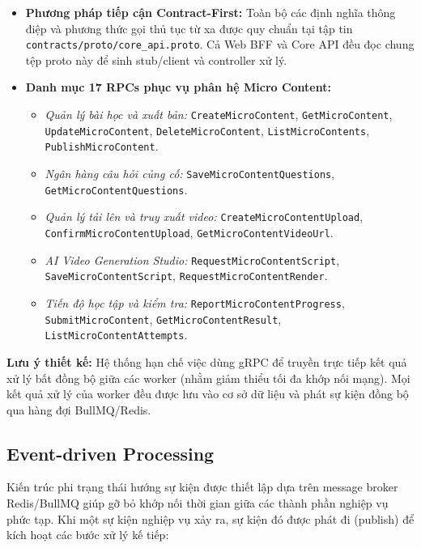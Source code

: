 \begin{itemize}
    \item \textbf{Phương pháp tiếp cận Contract-First:} Toàn bộ các định nghĩa
          thông điệp và phương thức gọi thủ tục từ xa được quy chuẩn tại tập tin
          \texttt{contracts/proto/core\_api.proto}. Cả Web BFF và Core API đều
          đọc chung tệp proto này để sinh stub/client và controller xử lý.
    \item \textbf{Danh mục 17 RPCs phục vụ phân hệ Micro Content:}
    \begin{itemize}
        \item \textit{Quản lý bài học và xuất bản:} \texttt{CreateMicroContent},
              \texttt{GetMicroContent}, \texttt{UpdateMicroContent},
              \texttt{DeleteMicroContent}, \texttt{ListMicroContents},
              \texttt{PublishMicroContent}.
        \item \textit{Ngân hàng câu hỏi củng cố:} \texttt{SaveMicroContentQuestions},
              \texttt{GetMicroContentQuestions}.
        \item \textit{Quản lý tải lên và truy xuất video:}
              \texttt{CreateMicroContentUpload}, \texttt{ConfirmMicroContentUpload},
              \texttt{GetMicroContentVideoUrl}.
        \item \textit{AI Video Generation Studio:}
              \texttt{RequestMicroContentScript}, \texttt{SaveMicroContentScript},
              \texttt{RequestMicroContentRender}.
        \item \textit{Tiến độ học tập và kiểm tra:}
              \texttt{ReportMicroContentProgress}, \texttt{SubmitMicroContent},
              \texttt{GetMicroContentResult}, \texttt{ListMicroContentAttempts}.
    \end{itemize}
\end{itemize}

\textbf{Lưu ý thiết kế:} Hệ thống hạn chế việc dùng gRPC để truyền trực
tiếp kết quả xử lý bất đồng bộ giữa các worker (nhằm giảm thiểu tối đa
khớp nối mạng). Mọi kết quả xử lý của worker đều được lưu vào cơ sở dữ
liệu và phát sự kiện đồng bộ qua hàng đợi BullMQ/Redis.

\subsection{Event-driven Processing}

Kiến trúc phi trạng thái hướng sự kiện được thiết lập dựa trên message
broker Redis/BullMQ giúp gỡ bỏ khớp nối thời gian giữa các thành phần
nghiệp vụ phức tạp. Khi một sự kiện nghiệp vụ xảy ra, sự kiện đó được phát
đi (publish) để kích hoạt các bước xử lý kế tiếp:

